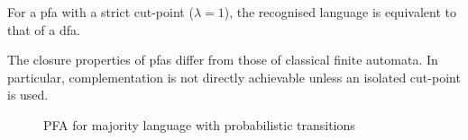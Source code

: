 \begin{corollary}
For a \gls{pfa} with a strict cut-point (\(\lambda = 1\)), the recognised language is equivalent to that of a \gls{dfa}.
\end{corollary}

\begin{observation}
The closure properties of \glspl{pfa} differ from those of classical finite automata. In particular, complementation is not directly achievable unless an isolated cut-point is used.
\end{observation}
\begin{figure}[h]
    \centering  
    \caption{PFA for majority language with probabilistic transitions}
    \label{fig:pfa-example}
\end{figure}
